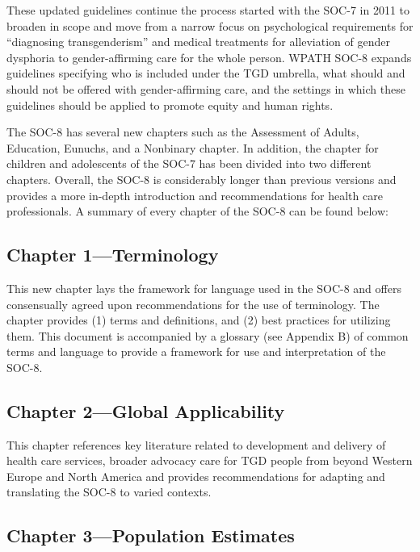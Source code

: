\documentclass[
]{book}
\begin{document}
These updated guidelines continue the process
started with the SOC-7 in 2011 to broaden in
scope and move from a narrow focus on psychological requirements for ``diagnosing transgenderism'' and medical treatments for alleviation of
gender dysphoria to gender-affirming care for the
whole person. WPATH SOC-8 expands guidelines
specifying who is included under the TGD
umbrella, what should and should not be offered
with gender-affirming care, and the settings in
which these guidelines should be applied to promote equity and human rights.

The SOC-8 has several new chapters such as
the Assessment of Adults, Education, Eunuchs,
and a Nonbinary chapter. In addition, the chapter
for children and adolescents of the SOC-7 has
been divided into two different chapters. Overall,
the SOC-8 is considerably longer than previous
versions and provides a more in-depth introduction and recommendations for health care professionals. A summary of every chapter of the
SOC-8 can be found below:

\hypertarget{chapter-1terminology}{%
\subsection*{Chapter 1---Terminology}\label{chapter-1terminology}}

This new chapter lays the framework for language
used in the SOC-8 and offers consensually agreed
upon recommendations for the use of terminology. The chapter provides (1) terms and definitions, and (2) best practices for utilizing them.
This document is accompanied by a glossary (see
Appendix B) of common terms and language to
provide a framework for use and interpretation
of the SOC-8.

\hypertarget{chapter-2global-applicability}{%
\subsection*{Chapter 2---Global Applicability}\label{chapter-2global-applicability}}

This chapter references key literature related to
development and delivery of health care services,
broader advocacy care for TGD people from
beyond Western Europe and North America and
provides recommendations for adapting and
translating the SOC-8 to varied contexts.

\hypertarget{chapter-3population-estimates}{%
\subsection*{Chapter 3---Population Estimates}\label{chapter-3population-estimates}}
\end{document}
